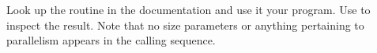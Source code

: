   Look up the  routine in the documentation and use it your
  program. Use  to inspect the result. Note that no size
  parameters or anything pertaining to parallelism appears in the
  calling sequence.
